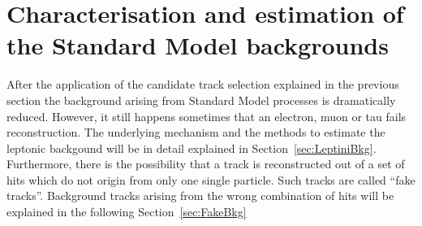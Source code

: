 \section{Characterisation and estimation of the Standard Model backgrounds}
\label{sec:BackgroundEstimation}
After the application of the candidate track selection explained in the previous section the background arising from Standard Model processes is dramatically reduced.
However, it still happens sometimes that an electron, muon or tau fails reconstruction.
The underlying mechanism and the methods to estimate the leptonic backgound will be in detail explained in Section~\ref{sec:LeptiniBkg}.
Furthermore, there is the possibility that a track is reconstructed out of a set of hits which do not origin from only one single particle.
Such tracks are called ``fake tracks''. 
Background tracks arising from the wrong combination of hits will be explained in the following Section~\ref{sec:FakeBkg}

